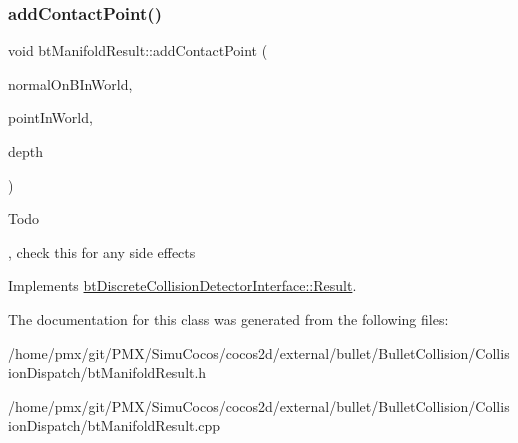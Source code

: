 \subsubsection{\texorpdfstring{add\+Contact\+Point()}{addContactPoint()}}
{\footnotesize\ttfamily void bt\+Manifold\+Result\+::add\+Contact\+Point (\begin{DoxyParamCaption}\item[{const bt\+Vector3 \&}]{normal\+On\+B\+In\+World,  }\item[{const bt\+Vector3 \&}]{point\+In\+World,  }\item[{bt\+Scalar}]{depth }\end{DoxyParamCaption})\hspace{0.3cm}{\ttfamily [virtual]}}

\begin{DoxyRefDesc}{Todo}
\item[\hyperlink{todo__todo000015}{Todo}], check this for any side effects \end{DoxyRefDesc}


Implements \hyperlink{structbtDiscreteCollisionDetectorInterface_1_1Result}{bt\+Discrete\+Collision\+Detector\+Interface\+::\+Result}.



The documentation for this class was generated from the following files\+:\begin{DoxyCompactItemize}
\item 
/home/pmx/git/\+P\+M\+X/\+Simu\+Cocos/cocos2d/external/bullet/\+Bullet\+Collision/\+Collision\+Dispatch/bt\+Manifold\+Result.\+h\item 
/home/pmx/git/\+P\+M\+X/\+Simu\+Cocos/cocos2d/external/bullet/\+Bullet\+Collision/\+Collision\+Dispatch/bt\+Manifold\+Result.\+cpp\end{DoxyCompactItemize}
